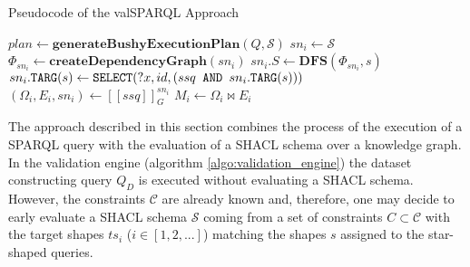     \begin{algorithm}[H]
    \caption{Pseudocode of the valSPARQL Approach}\label{algo:valSPARQL}
    \begin{algorithmic}[1]
    	\State $\textit{plan} \gets \textbf{generateBushyExecutionPlan}(Q,\mathcal{S})$ \label{algo:valSPARQL:decomp} 
    	 
    	    \State $sn_i \gets \mathcal{S}$ \label{algo:valSPARQL:reduction_start}
    	    \State $\Phi_{sn_i} \gets \textbf{createDependencyGraph}(sn_i)$
            \State $sn_i.S \gets \textbf{DFS}(\Phi_{sn_i}, s)$
    	    \State $sn_i.\texttt{TARG}(s) \gets \texttt{SELECT}(?x,id,(ssq \texttt{ AND } sn_i.\texttt{TARG}(s)))$\label{algo:valSPARQL:reduction_end}
    	    \State $(\Omega_i, E_i, sn_i) \gets [[ssq]]_G^{sn_i}$
    	    \State $M_i \gets \Omega_i \bowtie E_i$ \label{algo:valSPARQL:join}
    	\EndFor
    	\State {} \label{algo:valSPARQL:overall_join}
    \EndFunction
    \end{algorithmic}
    \end{algorithm}
    
    The approach described in this section combines the process of the execution of a SPARQL query with the evaluation of a SHACL schema over a knowledge graph. In the validation engine (algorithm \ref{algo:validation_engine}) the dataset constructing query $Q_D$ is executed without evaluating a SHACL schema. However, the constraints $\mathcal{C}$ are already known and, therefore, one may decide to early evaluate a SHACL schema $\mathcal{S}$ coming from a set of constraints $C \subset \mathcal{C}$ with the target shapes $ts_i$ ($i \in [1,2,...]$) matching the shapes $s$ assigned to the star-shaped queries.
    
    
    
    

